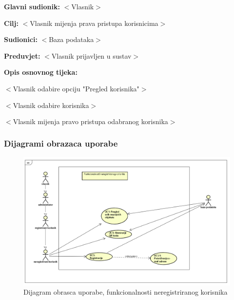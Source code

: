 \newpage
	\noindent {}
	\begin{packed_item}
		
		\item \textbf{Glavni sudionik: }$<$Vlasnik$>$
		\item  \textbf{Cilj:} $<$Vlasnik mijenja prava pristupa korisnicima$>$
		\item  \textbf{Sudionici:} $<$Baza podataka$>$
		\item  \textbf{Preduvjet:} $<$Vlasnik prijavljen u sustav$>$
		\item  \textbf{Opis osnovnog tijeka:}
		
		\item[] \begin{packed_enum}
			
			\item $<$Vlasnik odabire opciju "Pregled korisnika"$>$
			\item $<$Vlasnik odabire korisnika$>$
			\item $<$Vlasnik mijenja pravo pristupa odabranog korisnika$>$
			
		\end{packed_enum}
	\end{packed_item}

\newpage
	
	



\subsubsection{Dijagrami obrazaca uporabe}

\begin{figure}[H]
	\includegraphics[scale=0.4]{slike/neregistrirani_korisnik.png}
	\centering
	\caption{Dijagram obrasca uporabe, funkcionalnosti neregistriranog korisnika}
	\label{fig:promjene}
\end{figure}

